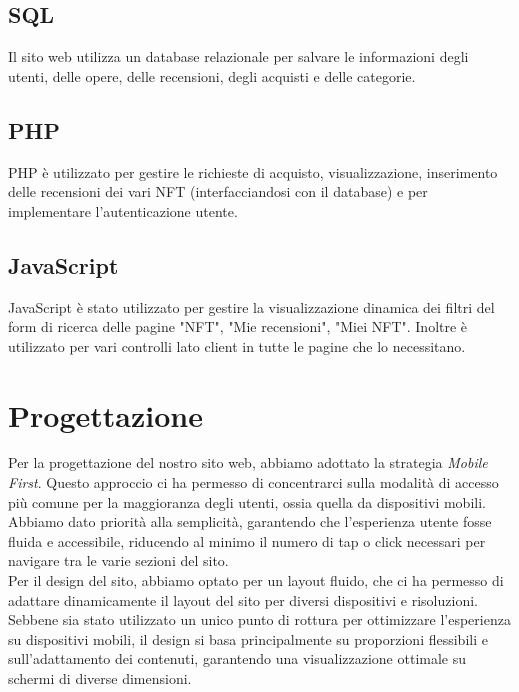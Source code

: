 \documentclass[10pt]{article}
\begin{document}
\subsection{SQL}
Il sito web utilizza un database relazionale per salvare le informazioni degli utenti, delle opere, delle recensioni, degli acquisti e delle categorie.
\subsection{PHP} 
PHP è utilizzato per gestire le richieste di acquisto, visualizzazione, inserimento delle recensioni dei vari NFT (interfacciandosi con il database) e per implementare l'autenticazione utente.
\subsection{JavaScript}
JavaScript è stato utilizzato per gestire la visualizzazione dinamica dei filtri del form di ricerca delle pagine "NFT", "Mie recensioni", "Miei NFT".
Inoltre è utilizzato per vari controlli lato client in tutte le pagine che lo necessitano.

\section{Progettazione}
Per la progettazione del nostro sito web, abbiamo adottato la strategia \textit{Mobile First}. Questo approccio ci ha permesso di concentrarci sulla modalità di accesso più comune per la maggioranza degli utenti, ossia quella da dispositivi mobili. Abbiamo dato priorità alla semplicità, garantendo che l’esperienza utente fosse fluida e accessibile, riducendo al minimo il numero di tap o click necessari per navigare tra le varie sezioni del sito.\\
Per il design del sito, abbiamo optato per un layout fluido, che ci ha permesso di adattare dinamicamente il layout del sito per diversi dispositivi e risoluzioni. Sebbene sia stato utilizzato un unico punto di rottura per ottimizzare l’esperienza su dispositivi mobili, il design si basa principalmente su proporzioni flessibili e sull’adattamento dei contenuti, garantendo una visualizzazione ottimale su schermi di diverse dimensioni.
\end{document}
